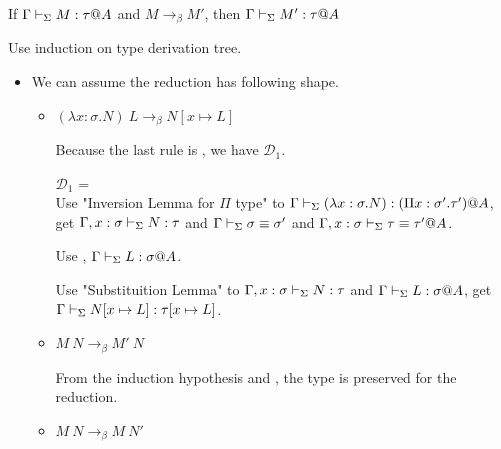 \begin{theorem}
	If $\G\V M:\tau@A$ and $M \longrightarrow_{\beta} M'$, then $\G\V M':\tau@A$\\
\end{theorem}

Use induction on type derivation tree.

\begin{itemize}
	\newcommand{\LB}{\longrightarrow_{\beta}}
		
	\item \TApp
	      	      
	      We can assume the reduction has following shape.
	      	      
	      \begin{itemize}
	      	\item $(\lambda x:\sigma.N)\ L \LB N[x\mapsto L]$
	      	      	      	      
	      	      Because the last rule is \TApp, we have $\mathcal{D}_1$.
	      	      	      	      
	      	      $\mathcal{D}_1$ = 
	      	      { \andalso {}} \\
	      	      	      	      
	      	      Use "Inversion Lemma for $\Pi$ type" to $\Gamma \vdash_\Sigma (\lambda x:\sigma.N) : (\Pi x:\sigma'.\tau')@A$,\\
	      	      get $\Gamma, x:\sigma \vdash_\Sigma N:\tau$ and $\Gamma \vdash_\Sigma \sigma \equiv \sigma'$ and $\Gamma ,x:\sigma \vdash_\Sigma \tau \equiv \tau'@A$.
	      	      	      	      
	      	      Use \TConv, $\Gamma \vdash_\Sigma L:\sigma @A$.
	      	      	      	      
	      	      Use "Substituition Lemma" to $\Gamma, x:\sigma \vdash_\Sigma N:\tau$ and $\Gamma \vdash_\Sigma L:\sigma @A$, get $\Gamma \vdash_\Sigma N[x\mapsto L]:\tau[x\mapsto L]$.
	      	      	      	      
	      	\item $M\ N \LB M'\ N$
	      	      	      	      
	      	      From the induction hypothesis and \TApp, the type is preserved for the reduction.
	      	\item $M\ N \LB M\ N'$
	      	      	      	      

\end{itemize}
\end{itemize}
